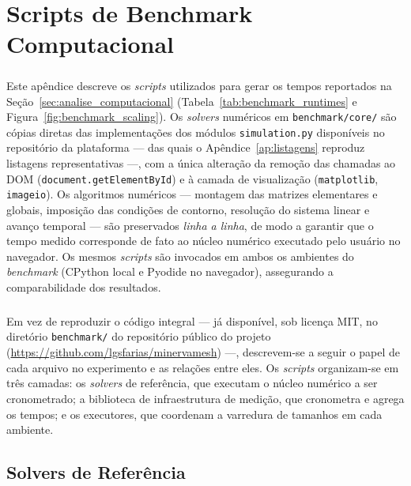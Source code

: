 \chapter{Scripts de Benchmark Computacional}
\label{apend:benchmark}

\paragraph{}Este apêndice descreve os \textit{scripts} utilizados para gerar os tempos reportados na Seção~\ref{sec:analise_computacional} (Tabela~\ref{tab:benchmark_runtimes} e Figura~\ref{fig:benchmark_scaling}). Os \textit{solvers} numéricos em \texttt{benchmark/core/} são cópias diretas das implementações dos módulos \texttt{simulation.py} disponíveis no repositório da plataforma --- das quais o Apêndice~\ref{ap:listagens} reproduz listagens representativas ---, com a única alteração da remoção das chamadas ao DOM (\texttt{document.getElementById}) e à camada de visualização (\texttt{matplotlib}, \texttt{imageio}). Os algoritmos numéricos --- montagem das matrizes elementares e globais, imposição das condições de contorno, resolução do sistema linear e avanço temporal --- são preservados \emph{linha a linha}, de modo a garantir que o tempo medido corresponde de fato ao núcleo numérico executado pelo usuário no navegador. Os mesmos \textit{scripts} são invocados em ambos os ambientes do \textit{benchmark} (CPython local e Pyodide no navegador), assegurando a comparabilidade dos resultados.

\paragraph{}Em vez de reproduzir o código integral --- já disponível, sob licença MIT, no diretório \texttt{benchmark/} do repositório público do projeto (\url{https://github.com/lgsfarias/minervamesh}) ---, descrevem-se a seguir o papel de cada arquivo no experimento e as relações entre eles. Os \textit{scripts} organizam-se em três camadas: os \textit{solvers} de referência, que executam o núcleo numérico a ser cronometrado; a biblioteca de infraestrutura de medição, que cronometra e agrega os tempos; e os executores, que coordenam a varredura de tamanhos em cada ambiente.

\section{Solvers de Referência}
\label{ap:bench_solvers}

